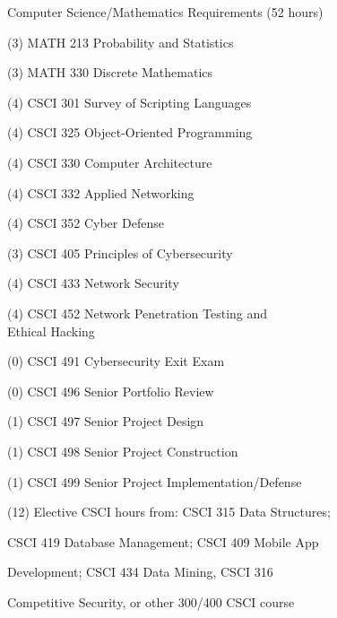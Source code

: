 \begin{reqgroup}{Computer Science/Mathematics Requirements (52 hours)}
\begin{checklist}
\begin{minipage}[t]{0.5\linewidth}
	\item (3) MATH 213 Probability and Statistics
	\item (3) MATH 330 Discrete Mathematics
	\item (4) CSCI 301 Survey of Scripting Languages
	\item (4) CSCI 325 Object-Oriented Programming
	\item (4) CSCI 330 Computer Architecture
	\item (4) CSCI 332 Applied Networking
	\item (4) CSCI 352 Cyber Defense
	\item (3) CSCI 405 Principles of Cybersecurity
	\item (4) CSCI 433 Network Security
	\item (4) CSCI 452 Network Penetration Testing and\\Ethical Hacking
\end{minipage}
\begin{minipage}[t]{0.5\linewidth}
	\item (0) CSCI 491 Cybersecurity Exit Exam
	\item (0) CSCI 496 Senior Portfolio Review
	\item (1) CSCI 497 Senior Project Design
	\item (1) CSCI 498 Senior Project Construction
	\item (1) CSCI 499 Senior Project Implementation/Defense
	\item (12) Elective CSCI hours from: CSCI 315 Data Structures;
	\item \hspace{1em} CSCI 419 Database Management; CSCI 409 Mobile App
	\item \hspace{1em} Development; CSCI 434 Data Mining, CSCI 316
	\item[] \hspace{1em} Competitive Security, or other 300/400 CSCI course


\end{minipage}
\end{checklist}
\end{reqgroup}

